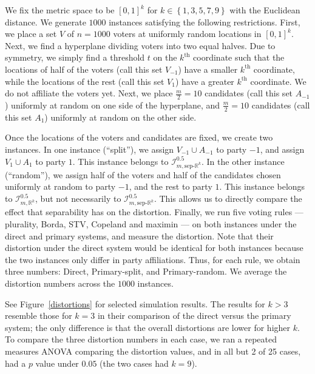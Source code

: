 \documentclass[letterpaper]{article} %
\theoremstyle{definition}
\newcommand{\set}[1]{\left\{#1\right\}}
\newcommand{\bbR}{\mathbb{R}}
\newcommand{\calI}{\mathcal{I}}
\newcommand{\pleft}{-1}
\newcommand{\pright}{1}
\newcommand{\sep}{\textrm{sep-}}
\newcommand{\euc}[1]{\bbR^{#1}}
\newcommand{\eucsep}[1]{\sep\euc{#1}}
\newcommand{\I}{\calI}
\begin{document}
We fix the metric space to be $[0,1]^k$ for $k \in \set{1,3,5,7,9}$ with the Euclidean distance. We generate $1000$ instances satisfying the following restrictions. First, we place a set $V$ of $n = 1000$ voters at uniformly random locations in $[0,1]^k$. Next, we find a hyperplane dividing voters into two equal halves. Due to symmetry, we simply find a threshold $t$ on the $k^{\text{th}}$ coordinate such that the locations of half of the voters (call this set $V_{\pleft}$) have a smaller $k^{\text{th}}$ coordinate, while the locations of the rest (call this set $V_{\pright}$) have a greater $k^{\text{th}}$ coordinate. We do not affiliate the voters yet. Next, we place $\frac{m}{2} = 10$ candidates (call this set $A_{\pleft}$) uniformly at random on one side of the hyperplane,  and $\frac{m}{2} = 10$ candidates (call this set $A_{\pright}$) uniformly at random on the other side.

Once the locations of the voters and candidates are fixed, we create two instances. In one instance (``split''), we assign $V_{\pleft} \cup A_{\pleft}$ to party $\pleft$, and assign $V_{\pright} \cup A_{\pright}$ to party $\pright$. This instance belongs to $\I^{0.5}_{m,\eucsep{k}}$. In the other instance (``random''), we assign half of the voters and half of the candidates chosen uniformly at random to party $\pleft$, and the rest to party $\pright$. This instance belongs to $\I^{0.5}_{m,\euc{k}}$, but not necessarily to $\I^{0.5}_{m,\eucsep{k}}$. This allows us to directly compare the effect that separability has on the distortion. Finally, we run five voting rules --- plurality, Borda, STV, Copeland and maximin --- on both instances under the direct and primary systems, and measure the distortion. Note that their distortion under the direct system would be identical for both instances because the two instances only differ in party affiliations. Thus, for each rule, we obtain three numbers: Direct, Primary-split, and Primary-random. We average the distortion numbers across the $1000$ instances.

See Figure~\ref{distortions} for selected simulation results. The results for $k > 3$ resemble those for $k=3$ in their comparison of the direct versus the primary system; the only difference is that the overall distortions are lower for higher $k$. To compare the three distortion numbers in each case, we ran a repeated measures ANOVA comparing the distortion values, and in all but 2 of 25 cases, had a $p$ value under $0.05$ (the two cases had $k=9$).
\end{document}
